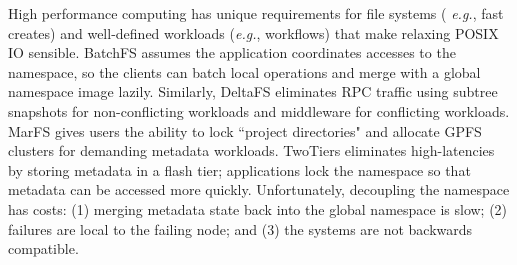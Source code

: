 
High performance computing has unique requirements for file systems ({\it
e.g.}, fast creates) and well-defined workloads ({\it e.g.}, workflows) that
make relaxing POSIX IO sensible.  BatchFS assumes the application coordinates
accesses to the namespace, so the clients can batch local operations and merge
with a global namespace image lazily. Similarly, DeltaFS eliminates RPC
traffic using subtree snapshots for non-conflicting workloads and middleware
for conflicting workloads. MarFS gives users the ability to lock
``project directories" and allocate GPFS clusters for demanding metadata
workloads. TwoTiers eliminates high-latencies by storing metadata in a flash
tier; applications lock the namespace so that metadata can be accessed more quickly.
Unfortunately, decoupling the namespace has costs: (1) merging metadata state
back into the global namespace is slow; (2) failures are local to the failing
node; and (3) the systems are not backwards compatible. 


